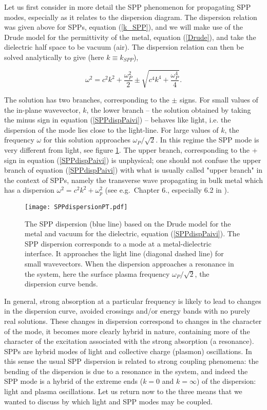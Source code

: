 \documentclass[12pt]{iopart}
\begin{document}
Let us first consider in more detail the SPP phenomenon for propagating SPP modes, especially as it relates to the dispersion diagram. The dispersion relation was given above for SPPs, equation (\ref{k_SPP}), and we will make use of the Drude model for the permittivity of the metal, equation (\ref{Drude}), and take the dielectric half space to be vacuum (air). The dispersion relation can then be solved analytically to give (here $k\equiv k_{SPP}$),

\begin{equation}
\omega^2 = c^2 k^2 + \frac{\omega_P^2}{2} \pm \sqrt{ c^4 k^4 + \frac{\omega_P^4}{4}} . \label{SPPdispPaivi}
\end{equation}

The solution has two branches, corresponding to the $\pm$ signs. For small values of the in-plane wavevector, $k$, the lower branch -- the solution obtained by taking the minus sign in equation (\ref{SPPdispPaivi}) -- behaves like light, i.e. the dispersion of the mode lies close to the light-line. For large values of $k$, the frequency $\omega$ for this solution approaches $\omega_P/\sqrt{2}$. 
In this regime the SPP mode is very different from light, see figure \ref{SPPdispersionPT}. The upper branch, corresponding to the + sign in equation (\ref{SPPdispPaivi}) is unphysical; one should not confuse the upper branch of equation (\ref{SPPdispPaivi}) with what is usually called "upper branch" in the context of SPPs, namely the transverse wave propagating in bulk metal
which has a dispersion $\omega^2= c^2 k^2 + \omega_p^2$ (see e.g.\ Chapter 6., especially 6.2 in \cite{Gaponenko2010}).  

\begin{figure}
\texttt{[image: SPPdispersionPT.pdf]}
\caption{The SPP dispersion (blue line) based on the Drude model for the metal and vacuum for the dielectric, equation (\ref{SPPdispPaivi}). The SPP dispersion corresponds to a mode 
at a metal-dielectric interface. It approaches the light line (diagonal dashed line) for small wavevectors. When the dispersion approaches a resonance in the system, here the surface plasma frequency $\omega_P/{\sqrt{2}}$, the dispersion curve bends.} 
\label{SPPdispersionPT}
\end{figure}

In general, strong absorption at a particular frequency is likely to lead to changes in the dispersion curve, avoided crossings and/or energy bands with no purely real solutions. 
These changes in dispersion correspond to changes in the character of the mode, it becomes more clearly hybrid in nature, containing more of the character of the excitation associated with the strong absorption (a resonance). SPPs are hybrid modes of light and collective charge (plasmon) oscillations. In this sense the usual SPP dispersion is related to strong coupling phenomena: the bending of the dispersion is due to a resonance in the system, and indeed the SPP mode is a hybrid of the extreme ends ($k=0$ and $k= \infty$) of the dispersion: light and plasma oscillations. Let us return now to the three means that we wanted to discuss by which light and SPP modes may be coupled. 
\end{document}
